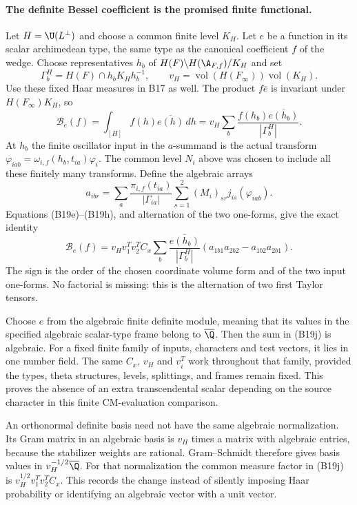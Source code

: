 \paragraph{The definite Bessel coefficient is the promised finite functional.}
Let $H=\U(L^\perp)$ and choose a common finite level $K_H$.
Let $e$ be a function in its scalar archimedean type, the same
type as the canonical coefficient $f$ of the wedge.  Choose
representatives $h_b$ of
$H(F)\backslash H(\A_{F,f})/K_H$ and set
\[
 \Gamma_b^H=H(F)\cap h_bK_Hh_b^{-1},\qquad
 v_H=\operatorname{vol}(H(F_\infty))\operatorname{vol}(K_H).
\]
Use these fixed Haar measures in B17 as well.  The product
$f\overline e$ is invariant under $H(F_\infty)K_H$, so
\[
 \mathcal B_e(f)=\int_{[H]}f(h)\overline{e(h)}\,dh
       =v_H\sum_b\frac{f(h_b)\overline{e(h_b)}}{|\Gamma_b^H|}.
 \tag{B19i}
\]
At $h_b$ the finite oscillator input in the $a$-summand is the
actual transform $\varphi_{iab}=\omega_{i,f}(h_b,t_{ia})
\varphi_i$.  The common level $N_i$ above was chosen to include
all these finitely many transforms.  Define the algebraic arrays
\[
 a_{ibr}=\sum_a\frac{\pi_{i,f}(t_{ia})}{|\Gamma_{ia}|}
             \sum_{s=1}^2(M_i)_{sr}j_{is}(\varphi_{iab}).
\]
Equations (B19e)--(B19h), and alternation of the two one-forms,
give the exact identity
\begin{equation}\label{B19-period}
 \mathcal B_e(f)
   =v_Hv_1^Tv_2^T C_x
       \sum_b\frac{\overline{e(h_b)}}{|\Gamma_b^H|}
          (a_{1b1}a_{2b2}-a_{1b2}a_{2b1}).
 \tag{B19j}
\end{equation}
The sign is the order of the chosen coordinate volume form and
of the two input one-forms.  No factorial is missing: this is the
alternation of two first Taylor tensors.

Choose $e$ from the algebraic finite definite module, meaning that
its values in the specified algebraic scalar-type frame belong
to $\overline\Q$.  Then the sum in (B19j) is algebraic.  For
a fixed finite family of inputs, characters and test vectors,
it lies in one number field.  The same $C_x$, $v_H$ and $v_i^T$
work throughout that family, provided the types, theta structures,
levels, splittings, and frames remain fixed.  This proves the
absence of an extra transcendental scalar depending on the
source character in this finite CM-evaluation comparison.

An orthonormal definite basis need not have the same algebraic
normalization.  Its Gram matrix in an algebraic basis is $v_H$
times a matrix with algebraic entries, because the stabilizer
weights are rational.  Gram--Schmidt therefore gives basis values
in $v_H^{-1/2}\overline\Q$.  For that normalization the common
measure factor in (B19j) is $v_H^{1/2}v_1^Tv_2^T C_x$.
This records the change instead of silently imposing Haar
probability or identifying an algebraic vector with a unit vector.

